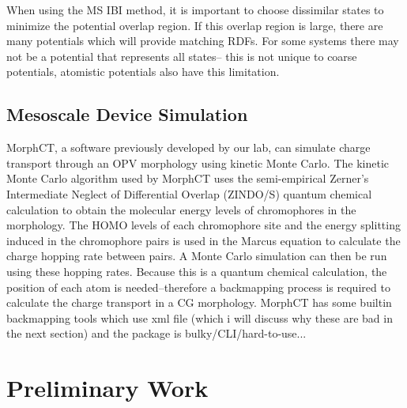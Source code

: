 When using the MS IBI method, it is important to choose dissimilar states to minimize the potential overlap region.
If this overlap region is large, there are many potentials which will provide matching RDFs. %
For some systems there may not be a potential that represents all states-- this is not unique to coarse potentials, atomistic potentials also have this limitation.

\subsection*{Mesoscale Device Simulation}

MorphCT, a software previously developed by our lab, can simulate charge transport through an OPV morphology using kinetic Monte Carlo\cite{Miller2018a,MorphCT,morphct2.2}.
The kinetic Monte Carlo algorithm used by MorphCT uses the semi-empirical Zerner's Intermediate Neglect of Differential Overlap (ZINDO/S) quantum chemical calculation to obtain the molecular energy levels of chromophores in the morphology.
The HOMO levels of each chromophore site and the energy splitting induced in the chromophore pairs is used in the Marcus equation to calculate the charge hopping rate between pairs.
A Monte Carlo simulation can then be run using these hopping rates.
Because this is a quantum chemical calculation, the position of each atom is needed--therefore a backmapping process is required to calculate the charge transport in a CG morphology.
MorphCT has some builtin backmapping tools which use xml file (which i will discuss why these are bad in the next section) and the package is bulky/CLI/hard-to-use...

\section*{Preliminary Work}



